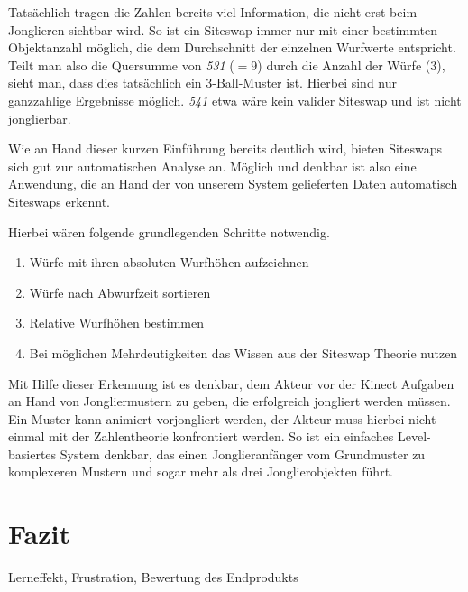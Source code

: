 \documentclass[12pt,a4paper,ngerman]{scrartcl}
\begin{document}
Tatsächlich tragen die Zahlen bereits viel Information, die nicht erst beim 
Jonglieren sichtbar wird. So ist ein Siteswap immer nur mit einer bestimmten 
Objektanzahl möglich, die dem Durchschnitt der einzelnen Wurfwerte entspricht.
Teilt man also die Quersumme von \textit{531} ($= 9$) durch die Anzahl der Würfe 
($3$), sieht man, dass dies tatsächlich ein 3-Ball-Muster ist. Hierbei sind nur 
ganzzahlige Ergebnisse möglich. \textit{541} etwa wäre kein valider Siteswap und ist
nicht jonglierbar.

Wie an Hand dieser kurzen Einführung bereits deutlich wird, bieten Siteswaps sich gut 
zur automatischen Analyse an. Möglich und denkbar ist also eine Anwendung, die an 
Hand der von unserem System gelieferten Daten automatisch Siteswaps erkennt.

Hierbei wären folgende grundlegenden Schritte notwendig.

\begin{enumerate}
\item Würfe mit ihren absoluten Wurfhöhen aufzeichnen
\item Würfe nach Abwurfzeit sortieren
\item Relative Wurfhöhen bestimmen
\item Bei möglichen Mehrdeutigkeiten das Wissen aus der Siteswap Theorie nutzen
\end{enumerate}

Mit Hilfe dieser Erkennung ist es denkbar, dem Akteur vor der Kinect Aufgaben an Hand 
von Jongliermustern zu geben, die erfolgreich jongliert werden müssen. Ein Muster
kann animiert vorjongliert werden, der Akteur muss hierbei nicht einmal mit der 
Zahlentheorie konfrontiert werden. So ist ein einfaches Level-basiertes System 
denkbar, das einen Jonglieranfänger vom Grundmuster zu komplexeren Mustern und
sogar mehr als drei Jonglierobjekten führt.

\section{Fazit}

Lerneffekt, Frustration, Bewertung des Endprodukts


\newpage
\end{document}
